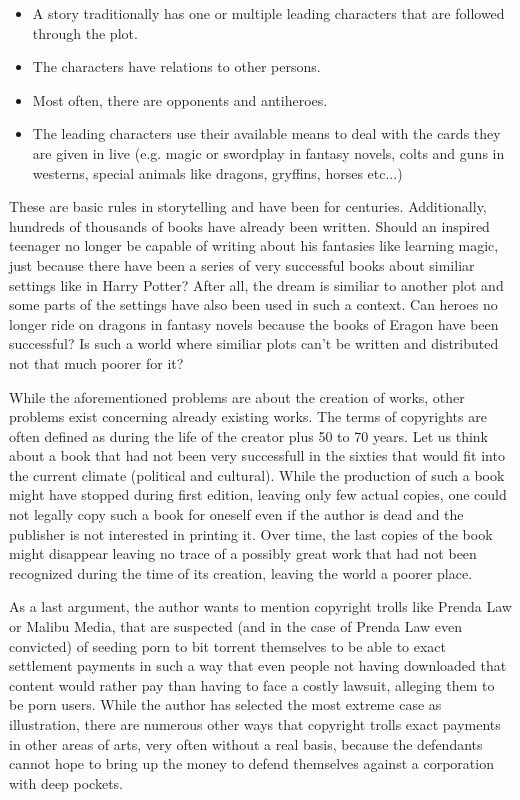 \documentclass[a4paper]{report}
\begin{document}
\begin{itemize}
	\item A story traditionally has one or multiple leading characters that are followed through the plot.
	\item The characters have relations to other persons.
	\item Most often, there are opponents and antiheroes.
	\item The leading characters use their available means to deal with the cards they are given in live (e.g. magic or swordplay in fantasy novels, colts and guns in westerns, special animals like dragons, gryffins, horses etc...)
\end{itemize} 
These are basic rules in storytelling and have been for centuries. Additionally, hundreds of thousands of books have already been written. Should an inspired teenager no longer be capable of writing about his fantasies like learning magic, just because there have been a series of very successful books about similiar settings like in Harry Potter? After all, the dream is similiar to another plot and some parts of the settings have also been used in such a context. Can heroes no longer ride on dragons in fantasy novels because the books of Eragon have been successful? Is such a world where similiar plots can't be written and distributed not that much poorer for it?

While the aforementioned problems are about the creation of works, other problems exist concerning already existing works. The terms of copyrights are often defined as during the life of the creator plus 50 to 70 years. Let us think about a book that had not been very successfull in the sixties that would fit into the current climate (political and cultural). While the production of such a book might have stopped during first edition, leaving only few actual copies, one could not legally copy such a book for oneself even if the author is dead and the publisher is not interested in printing it. Over time, the last copies of the book might disappear leaving no trace of a possibly great work that had not been recognized during the time of its creation, leaving the world a poorer place.

As a last argument, the author wants to mention copyright trolls like Prenda Law or Malibu Media, that are suspected (and in the case of Prenda Law even convicted) of seeding porn to bit torrent themselves to be able to exact settlement payments in such a way that even people not having downloaded that content would rather pay than having to face a costly lawsuit, alleging them to be porn users. While the author has selected the most extreme case as illustration, there are numerous other ways that copyright trolls exact payments in other areas of arts, very often without a real basis, because the defendants cannot hope to bring up the money to defend themselves against a corporation with deep pockets.
\end{document}
